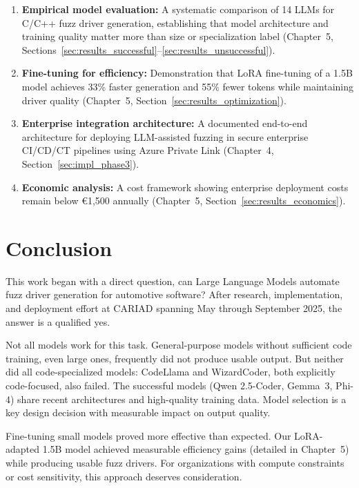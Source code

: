 \begin{enumerate}
    \item \textbf{Empirical model evaluation:} A systematic comparison of 14 LLMs for C/C++ fuzz driver generation, establishing that model architecture and training quality matter more than size or specialization label (Chapter~5, Sections~\ref{sec:results_successful}--\ref{sec:results_unsuccessful}).
    \item \textbf{Fine-tuning for efficiency:} Demonstration that LoRA fine-tuning of a 1.5B model achieves 33\% faster generation and 55\% fewer tokens while maintaining driver quality (Chapter~5, Section~\ref{sec:results_optimization}).
    \item \textbf{Enterprise integration architecture:} A documented end-to-end architecture for deploying LLM-assisted fuzzing in secure enterprise CI/CD/CT pipelines using Azure Private Link (Chapter~4, Section~\ref{sec:impl_phase3}).
    \item \textbf{Economic analysis:} A cost framework showing enterprise deployment costs remain below \euro{}1,500 annually (Chapter~5, Section~\ref{sec:results_economics}).
\end{enumerate}


\section{Conclusion}
\label{sec:discussion_conclusion}

This work began with a direct question, can Large Language Models automate fuzz driver generation for automotive software? After research, implementation, and deployment effort at CARIAD spanning May through September 2025, the answer is a qualified yes.

Not all models work for this task. General-purpose models without sufficient code training, even large ones, frequently did not produce usable output. But neither did all code-specialized models: CodeLlama and WizardCoder, both explicitly code-focused, also failed. The successful models (Qwen 2.5-Coder, Gemma~3, Phi-4) share recent architectures and high-quality training data. Model selection is a key design decision with measurable impact on output quality.

Fine-tuning small models proved more effective than expected. Our LoRA-adapted 1.5B model achieved measurable efficiency gains (detailed in Chapter~5) while producing usable fuzz drivers. For organizations with compute constraints or cost sensitivity, this approach deserves consideration.

